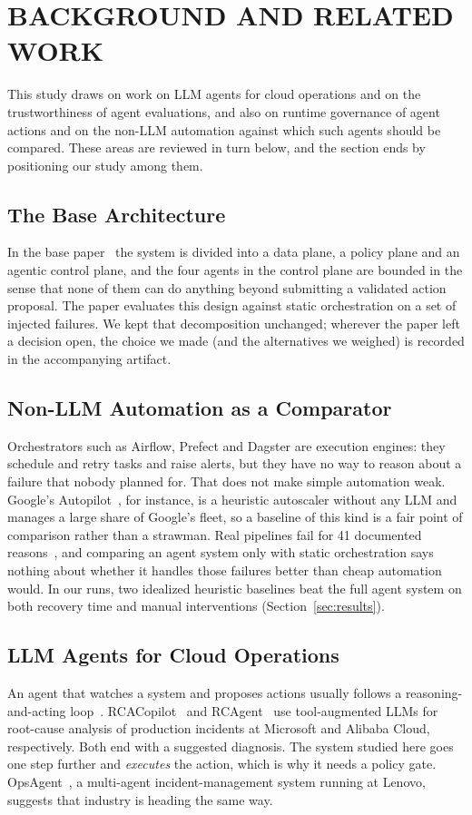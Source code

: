 \section{BACKGROUND AND RELATED WORK}\label{sec:related}

This study draws on work on LLM agents for cloud operations and on the trustworthiness of agent
evaluations, and also on runtime governance of agent actions and on the non-LLM automation against
which such agents should be compared. These areas are reviewed in turn below, and the section ends by
positioning our study among them.

\subsection{The Base Architecture}
In the base paper~\cite{kirubakaran2025governing} the system is divided into a data plane, a policy
plane and an agentic control plane, and the four agents in the control plane are bounded in the sense
that none of them can do anything beyond submitting a validated action proposal. The paper evaluates
this design against static orchestration on a set of injected failures. We kept that decomposition
unchanged; wherever the paper left a decision open, the choice we made (and the alternatives we
weighed) is recorded in the accompanying artifact.

\subsection{Non-LLM Automation as a Comparator}
Orchestrators such as Airflow, Prefect and Dagster are execution engines: they schedule and retry
tasks and raise alerts, but they have no way to reason about a failure that nobody planned for. That
does not make simple automation weak. Google's Autopilot~\cite{rzadca2020autopilot}, for instance,
is a heuristic autoscaler without any LLM and manages a large share of Google's fleet, so a baseline
of this kind is a fair point of comparison rather than a strawman. Real pipelines fail for 41 documented reasons~\cite{foidl2024datapipeline},
and comparing an agent system only with static orchestration says nothing about whether it handles
those failures better than cheap automation would. In our runs, two idealized heuristic baselines beat
the full agent system on both recovery time and manual interventions (Section~\ref{sec:results}).

\subsection{LLM Agents for Cloud Operations}
An agent that watches a system and proposes actions usually follows a reasoning-and-acting
loop~\cite{yao2022react}. RCACopilot~\cite{chen2024rcacopilot} and RCAgent~\cite{wang2023rcagent} use
tool-augmented LLMs for root-cause analysis of production incidents at Microsoft and Alibaba Cloud,
respectively. Both end with a suggested diagnosis. The system studied here goes one step further and
\emph{executes} the action, which is why it needs a policy gate. OpsAgent~\cite{luo2025opsagent}, a
multi-agent incident-management system running at Lenovo, suggests that industry is heading the same
way.

